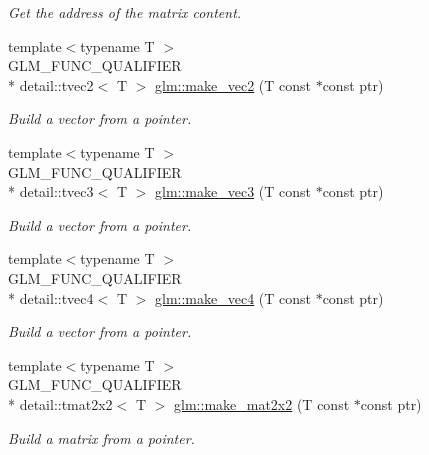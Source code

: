 \begin{DoxyCompactItemize}
\begin{DoxyCompactList}\small\item\em Get the address of the matrix content. \end{DoxyCompactList}\item 
{\footnotesize template$<$typename T $>$ }\\G\-L\-M\-\_\-\-F\-U\-N\-C\-\_\-\-Q\-U\-A\-L\-I\-F\-I\-E\-R \\*
detail\-::tvec2$<$ T $>$ \hyperlink{group__gtc__type__ptr_ga60e64ef452541f76f7b5b4e04b18062a}{glm\-::make\-\_\-vec2} (T const $\ast$const ptr)
\begin{DoxyCompactList}\small\item\em Build a vector from a pointer. \end{DoxyCompactList}\item 
{\footnotesize template$<$typename T $>$ }\\G\-L\-M\-\_\-\-F\-U\-N\-C\-\_\-\-Q\-U\-A\-L\-I\-F\-I\-E\-R \\*
detail\-::tvec3$<$ T $>$ \hyperlink{group__gtc__type__ptr_ga0e2e7d24d80edb5a95a86c6a76ae5a41}{glm\-::make\-\_\-vec3} (T const $\ast$const ptr)
\begin{DoxyCompactList}\small\item\em Build a vector from a pointer. \end{DoxyCompactList}\item 
{\footnotesize template$<$typename T $>$ }\\G\-L\-M\-\_\-\-F\-U\-N\-C\-\_\-\-Q\-U\-A\-L\-I\-F\-I\-E\-R \\*
detail\-::tvec4$<$ T $>$ \hyperlink{group__gtc__type__ptr_ga5d91c17941c35effc46b335ad6fb6252}{glm\-::make\-\_\-vec4} (T const $\ast$const ptr)
\begin{DoxyCompactList}\small\item\em Build a vector from a pointer. \end{DoxyCompactList}\item 
{\footnotesize template$<$typename T $>$ }\\G\-L\-M\-\_\-\-F\-U\-N\-C\-\_\-\-Q\-U\-A\-L\-I\-F\-I\-E\-R \\*
detail\-::tmat2x2$<$ T $>$ \hyperlink{group__gtc__type__ptr_ga1d0007368a23e89e4a0efcda06c1fa27}{glm\-::make\-\_\-mat2x2} (T const $\ast$const ptr)
\begin{DoxyCompactList}\small\item\em Build a matrix from a pointer. \end{DoxyCompactList}\item 

\end{DoxyCompactItemize}
